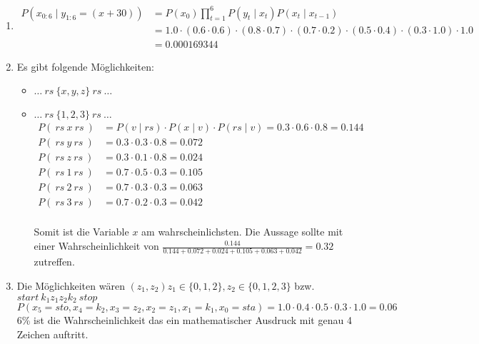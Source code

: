 \documentclass[a4paper,10pt]{article}
\begin{document}
\begin{enumerate}[~~(a)]
\begin{center}
    \end{center}
    \item
    \begin{align*}
        P(x_{0:6} \mid y_{1:6} = (x+30)) &= P(x_0)\prod_{t=1}^{6}P(y_t\mid x_t)P(x_t\mid x_{t - 1}) \\
        &= 1.0  \cdot (0.6 \cdot 0.6) \cdot (0.8 \cdot 0.7) \cdot (0.7 \cdot 0.2) \cdot (0.5 \cdot 0.4) \cdot (0.3 \cdot 1.0) \cdot 1.0 \\
        &= 0.000169344
    \end{align*}

    \item Es gibt folgende Möglichkeiten:
    \begin{itemize}
        \item $\dots ~rs~ \{x, y, z\} ~rs~ \dots$
        \item $\dots ~rs~ \{1, 2 ,3\} ~rs~ \dots$
        \begin{align*}
            P(~rs~ x ~rs~) &= P(v \mid rs) \cdot P(x \mid v) \cdot P(rs \mid v) = 0.3 \cdot 0.6 \cdot 0.8 = 0.144 \\
            P(~rs~ y ~rs~) &= 0.3 \cdot 0.3 \cdot 0.8 = 0.072 \\
            P(~rs~ z ~rs~) &= 0.3 \cdot 0.1 \cdot 0.8 = 0.024 \\
            P(~rs~ 1 ~rs~) &= 0.7 \cdot 0.5 \cdot 0.3 = 0.105 \\
            P(~rs~ 2 ~rs~) &= 0.7 \cdot 0.3 \cdot 0.3 = 0.063 \\
            P(~rs~ 3 ~rs~) &= 0.7 \cdot 0.2 \cdot 0.3 = 0.042 \\
        \end{align*}

        Somit ist die Variable $x$ am wahrscheinlichsten. Die Aussage sollte mit einer Wahrscheinlichkeit von $\frac{0.144}{0.144 + 0.072 + 0.024 + 0.105 + 0.063 + 0.042} = 0.32$ zutreffen.

    \end{itemize}
    \item Die Möglichkeiten wären $(z_1, z_2) z_1 \in \{0,1,2\}, z_2 \in \{0,1,2,3\}$ bzw. $start~k_1 z_1 z_2 k_2~stop$
    $$P(x_5 = sto,x_4 = k_2, x_3 = z_2, x_2 = z_1, x_1 = k_1, x_0 = sta) = 1.0 \cdot 0.4 \cdot 0.5 \cdot 0.3 \cdot 1.0 = 0.06$$
    6\% ist die Wahrscheinlichkeit das ein mathematischer Ausdruck mit genau 4 Zeichen auftritt.
\end{enumerate}
\end{document}
